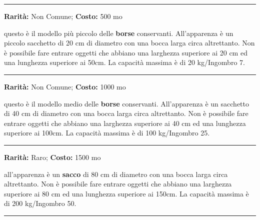 \begin{multicols}{2}
\smallskip\noindent\rule{\linewidth}{2pt}  \hypertarget{BorsaConservanteTipoI}{}\medskip{}\noindent\label{BorsaConservanteTipoI}

\textbf{Rarità:} Non Comune; \textbf{Costo:} 500 mo

questo è il modello più piccolo delle \textbf{borse} conservanti. All'apparenza è un piccolo sacchetto di 20 cm di diametro con una bocca larga circa altrettanto.
Non è possibile fare entrare oggetti che abbiano una larghezza superiore ai 20 cm ed una lunghezza superiore ai 50cm.
La capacità massima è di 20 kg/Ingombro 7.

\smallskip\noindent\rule{\linewidth}{2pt}  \hypertarget{BorsaConservanteTipoII}{}\medskip{}\noindent\label{BorsaConservanteTipoII}

\textbf{Rarità:} Non Comune; \textbf{Costo:} 1000 mo

questo è il modello medio delle \textbf{borse} conservanti. All'apparenza è un sacchetto di 40 cm di diametro con una bocca larga circa altrettanto.
Non è possibile fare entrare oggetti che abbiano una larghezza superiore ai 40 cm ed una lunghezza superiore ai 100cm.
La capacità massima è di 100 kg/Ingombro 25.

\smallskip\noindent\rule{\linewidth}{2pt}  \hypertarget{BorsaConservanteTipoIII}{}\medskip{}\noindent\label{BorsaConservanteTipoIII}

\textbf{Rarità:} Raro; \textbf{Costo:} 1500 mo

all'apparenza è un \textbf{sacco} di 80 cm di diametro con una bocca larga circa altrettanto.
Non è possibile fare entrare oggetti che abbiano una larghezza superiore ai 80 cm ed una lunghezza superiore ai 150cm. La capacità massima è di 200 kg/Ingombro 50.


\smallskip\noindent\rule{\linewidth}{2pt}  \hypertarget{BorsaConservanteTipoIV}{}\medskip{}\noindent\label{BorsaConservanteTipoIV}


\end{multicols}
